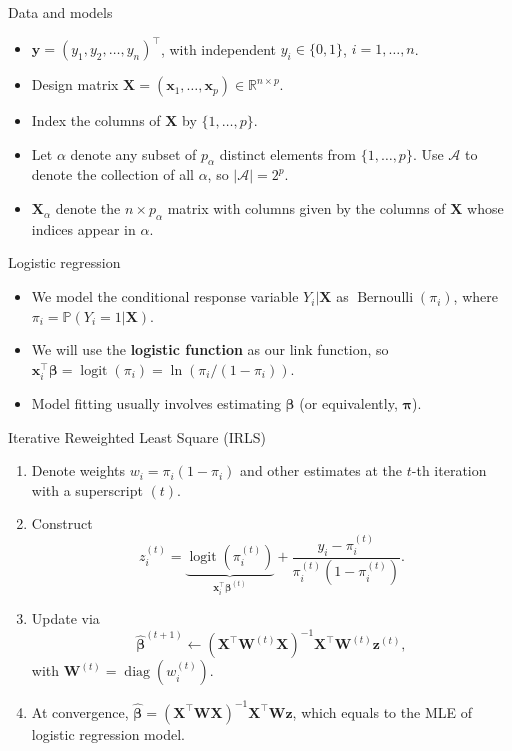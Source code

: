 \documentclass[12pt,aspectratio=169]{beamer}
\newcommand{\bx}{\boldsymbol{x}}
\newcommand{\bX}{\boldsymbol{X}}
\newcommand{\by}{\boldsymbol{y}}
\newcommand{\bW}{\boldsymbol{W}}
\newcommand{\bz}{\boldsymbol{z}}
\newcommand{\bbeta}{\boldsymbol{\beta}}
\newcommand{\bbetaHat}{\widehat{\boldsymbol{\beta}}}
\newcommand{\bPi}{\boldsymbol{\pi}}
\newcommand{\piit}{\pi_i^{(t)}}
\newcommand{\logit}{\operatorname{logit}}
\begin{document}
\begin{frame}{Data and models}
	\begin{itemize}
		\item $ \by = (y_1, y_2, \dots, y_n)^\top $, with independent $ y_i  \in \lbrace0, 1\rbrace$, $ i = 1, \dots, n $. 
		\item Design matrix $ \bX = (\bx_1, \dots, \bx_p) \in \mathbb{R}^{n \times p}$. 
		\item Index the columns of $ \bX $ by $ \lbrace 1, \dots, p \rbrace$. 
		\item 
		Let $ \alpha $ denote any subset of $ p_\alpha $ distinct elements from $ \lbrace 1, \dots, p \rbrace $. Use $ \mathcal{A} $ to denote the collection of all $ \alpha $, so $ |\mathcal{A}| = 2^p $.
		
		\item $ \bX_\alpha $ denote the $ n \times p_\alpha $ matrix with columns given by the columns of $ \bX $ whose indices appear in $ \alpha $.
	\end{itemize}
\end{frame}



\begin{frame}{Logistic regression}
 \begin{itemize}
 	\item We model the conditional response variable $ Y_i | \bX$ as $ \operatorname{Bernoulli}(\pi_i) $, where $ \pi_i = \mathbb{P}(Y_i  = 1| \bX)$. 
 	\item We will use the \textbf{logistic function} as our link function, so $ \bx_i^\top \bbeta = \operatorname{logit}(\pi_i) = \ln \left( \pi_i/(1-\pi_i) \right)$.
 	\item Model fitting usually involves estimating $ \bbeta $ (or equivalently, $ \bPi $). 
 \end{itemize}
\end{frame}

\begin{frame}{Iterative Reweighted Least Square (IRLS)}
	\begin{enumerate}
	\item Denote weights $ w_i = \pi_i (1-\pi_i)$ and other estimates at the $ t $-th iteration with a superscript $ (t) $.
	\item Construct 
	\begin{equation*}
	z_i^{(t)} = \underbrace{\logit\left( \piit \right)}_{\bx_i^\top \bbeta^{(t)}}+ \frac{y_i-\piit}{\piit(1-\piit)}.
	\end{equation*}
	\item Update via
	\begin{equation*}
	\bbetaHat^{(t+1)} \leftarrow (\bX^\top \bW^{(t)} \bX)^{-1} \bX^\top \bW^{(t)} \bz^{(t)},
	\end{equation*}
	with $ \bW^{(t)} = \operatorname{diag}\left(w_i^{(t)}\right)$.
	
	\item At convergence, $ \bbetaHat = (\bX^\top \bW \bX)^{-1}\bX^\top \bW \bz$, which equals to the MLE of logistic regression model.
\end{enumerate}
\end{frame}
\end{document}
